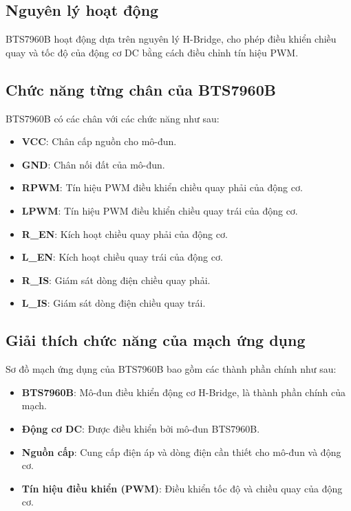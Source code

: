         \subsection{Nguyên lý hoạt động}
            BTS7960B hoạt động dựa trên nguyên lý H-Bridge, cho phép điều khiển chiều quay và tốc độ của động cơ DC bằng cách điều chỉnh tín hiệu PWM.
            
        \subsection{Chức năng từng chân của BTS7960B}
            BTS7960B có các chân với các chức năng như sau:
            
            \begin{itemize}
                \item \textbf{VCC}: Chân cấp nguồn cho mô-đun.
                \item \textbf{GND}: Chân nối đất của mô-đun.
                \item \textbf{RPWM}: Tín hiệu PWM điều khiển chiều quay phải của động cơ.
                \item \textbf{LPWM}: Tín hiệu PWM điều khiển chiều quay trái của động cơ.
                \item \textbf{R\_EN}: Kích hoạt chiều quay phải của động cơ.
                \item \textbf{L\_EN}: Kích hoạt chiều quay trái của động cơ.
                \item \textbf{R\_IS}: Giám sát dòng điện chiều quay phải.
                \item \textbf{L\_IS}: Giám sát dòng điện chiều quay trái.
            \end{itemize}
            
        \subsection{Giải thích chức năng của mạch ứng dụng}
            Sơ đồ mạch ứng dụng của BTS7960B bao gồm các thành phần chính như sau:
            
            \begin{itemize}
                \item \textbf{BTS7960B}: Mô-đun điều khiển động cơ H-Bridge, là thành phần chính của mạch.
                \item \textbf{Động cơ DC}: Được điều khiển bởi mô-đun BTS7960B.
                \item \textbf{Nguồn cấp}: Cung cấp điện áp và dòng điện cần thiết cho mô-đun và động cơ.
                \item \textbf{Tín hiệu điều khiển (PWM)}: Điều khiển tốc độ và chiều quay của động cơ.
            \end{itemize}
            
